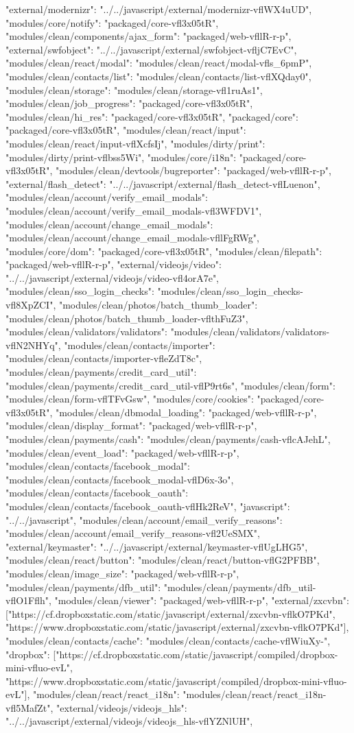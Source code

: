 {"external/modernizr": "../../javascript/external/modernizr-vflWX4uUD", "modules/core/notify": "packaged/core-vfl3x05tR", "modules/clean/components/ajax_form": "packaged/web-vfllR-r-p", "external/swfobject": "../../javascript/external/swfobject-vfljC7EvC", "modules/clean/react/modal": "modules/clean/react/modal-vfls_6pmP", "modules/clean/contacts/list": "modules/clean/contacts/list-vflXQday0", "modules/clean/storage": "modules/clean/storage-vfl1ruAs1", "modules/clean/job_progress": "packaged/core-vfl3x05tR", "modules/clean/hi_res": "packaged/core-vfl3x05tR", "packaged/core": "packaged/core-vfl3x05tR", "modules/clean/react/input": "modules/clean/react/input-vflXcfsIj", "modules/dirty/print": "modules/dirty/print-vflbss5Wi", "modules/core/i18n": "packaged/core-vfl3x05tR", "modules/clean/devtools/bugreporter": "packaged/web-vfllR-r-p", "external/flash_detect": "../../javascript/external/flash_detect-vflLuenon", "modules/clean/account/verify_email_modals": "modules/clean/account/verify_email_modals-vfl3WFDV1", "modules/clean/account/change_email_modals": "modules/clean/account/change_email_modals-vfllFgRWg", "modules/core/dom": "packaged/core-vfl3x05tR", "modules/clean/filepath": "packaged/web-vfllR-r-p", "external/videojs/video": "../../javascript/external/videojs/video-vfl4orA7e", "modules/clean/sso_login_checks": "modules/clean/sso_login_checks-vfl8XpZCI", "modules/clean/photos/batch_thumb_loader": "modules/clean/photos/batch_thumb_loader-vflthFuZ3", "modules/clean/validators/validators": "modules/clean/validators/validators-vflN2NHYq", "modules/clean/contacts/importer": "modules/clean/contacts/importer-vfleZdT8c", "modules/clean/payments/credit_card_util": "modules/clean/payments/credit_card_util-vflP9rt6s", "modules/clean/form": "modules/clean/form-vflTFvGsw", "modules/core/cookies": "packaged/core-vfl3x05tR", "modules/clean/dbmodal_loading": "packaged/web-vfllR-r-p", "modules/clean/display_format": "packaged/web-vfllR-r-p", "modules/clean/payments/cash": "modules/clean/payments/cash-vflcAJehL", "modules/clean/event_load": "packaged/web-vfllR-r-p", "modules/clean/contacts/facebook_modal": "modules/clean/contacts/facebook_modal-vflD6x-3o", "modules/clean/contacts/facebook_oauth": "modules/clean/contacts/facebook_oauth-vflHk2ReV", "javascript": "../../javascript", "modules/clean/account/email_verify_reasons": "modules/clean/account/email_verify_reasons-vfl2UeSMX", "external/keymaster": "../../javascript/external/keymaster-vflUgLHG5", "modules/clean/react/button": "modules/clean/react/button-vflG2PFBB", "modules/clean/image_size": "packaged/web-vfllR-r-p", "modules/clean/payments/dfb_util": "modules/clean/payments/dfb_util-vflO1Fflh", "modules/clean/viewer": "packaged/web-vfllR-r-p", "external/zxcvbn": ["https://cf.dropboxstatic.com/static/javascript/external/zxcvbn-vflkO7PKd", "https://www.dropboxstatic.com/static/javascript/external/zxcvbn-vflkO7PKd"], "modules/clean/contacts/cache": "modules/clean/contacts/cache-vflWiuXy-", "dropbox": ["https://cf.dropboxstatic.com/static/javascript/compiled/dropbox-mini-vfluo-evL", "https://www.dropboxstatic.com/static/javascript/compiled/dropbox-mini-vfluo-evL"], "modules/clean/react/react_i18n": "modules/clean/react/react_i18n-vfl5MafZt", "external/videojs/videojs_hls": "../../javascript/external/videojs/videojs_hls-vflYZNlUH", }
